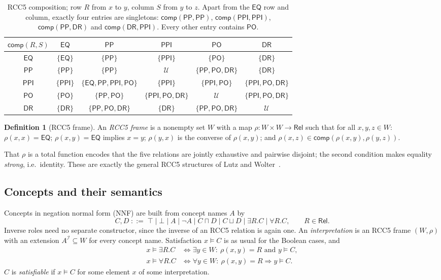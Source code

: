 \documentclass[11pt]{article}
\newcommand{\DR}{\mathsf{DR}}
\newcommand{\PO}{\mathsf{PO}}
\newcommand{\PP}{\mathsf{PP}}
\newcommand{\PPI}{\mathsf{PPI}}
\newcommand{\EQ}{\mathsf{EQ}}
\newcommand{\Rel}{\mathsf{Rel}}
\newcommand{\comp}{\mathsf{comp}}
\theoremstyle{plain}
\theoremstyle{definition}
\newtheorem{definition}[theorem]{Definition}
\begin{document}
\begin{table}[t]
\centering
\footnotesize
\setlength{\tabcolsep}{4pt}
\renewcommand{\arraystretch}{1.2}
\begin{tabular}{@{}c|ccccc@{}}
$\comp(R,S)$ & $\EQ$ & $\PP$ & $\PPI$ & $\PO$ & $\DR$\\
\midrule
$\EQ$ & $\{\EQ\}$ & $\{\PP\}$ & $\{\PPI\}$ & $\{\PO\}$ & $\{\DR\}$\\
$\PP$ & $\{\PP\}$ & $\{\PP\}$ & $\mathcal U$ & $\{\PP,\PO,\DR\}$ & $\{\DR\}$\\
$\PPI$ & $\{\PPI\}$ & $\{\EQ,\PP,\PPI,\PO\}$ & $\{\PPI\}$ & $\{\PPI,\PO\}$ & $\{\PPI,\PO,\DR\}$\\
$\PO$ & $\{\PO\}$ & $\{\PP,\PO\}$ & $\{\PPI,\PO,\DR\}$ & $\mathcal U$ & $\{\PPI,\PO,\DR\}$\\
$\DR$ & $\{\DR\}$ & $\{\PP,\PO,\DR\}$ & $\{\DR\}$ & $\{\PP,\PO,\DR\}$ & $\mathcal U$\\
\end{tabular}
\caption{RCC5 composition; row $R$ from $x$ to $y$, column $S$ from $y$ to $z$.
Apart from the $\EQ$ row and column, exactly four entries are singletons:
$\comp(\PP,\PP)$, $\comp(\PPI,\PPI)$, $\comp(\PP,\DR)$ and $\comp(\DR,\PPI)$. Every
other entry contains $\PO$.}
\label{tab:comp}
\end{table}

\begin{definition}[RCC5 frame]
An \emph{RCC5 frame} is a nonempty set $W$ with a map $\rho:W\times W\to\Rel$
such that for all $x,y,z\in W$: $\rho(x,x)=\EQ$; $\rho(x,y)=\EQ$ implies $x=y$;
$\rho(y,x)$ is the converse of $\rho(x,y)$; and $\rho(x,z)\in
\comp(\rho(x,y),\rho(y,z))$.
\end{definition}

That $\rho$ is a total function encodes that the five relations are jointly
exhaustive and pairwise disjoint; the second condition makes equality
\emph{strong}, i.e.\ identity. These are exactly the general RCC5 structures of
Lutz and Wolter~\cite[\S8]{LutzWolter2006}.

\subsection{Concepts and their semantics}

Concepts in negation normal form (NNF) are built from concept names $A$ by
\[
  C,D \;::=\; \top \mid \bot \mid A \mid \neg A \mid C\sqcap D \mid C\sqcup D
  \mid \exists R.C \mid \forall R.C, \qquad R\in\Rel .
\]
Inverse roles need no separate constructor, since the inverse of an RCC5
relation is again one. An \emph{interpretation} is an RCC5 frame $(W,\rho)$
with an extension $A^{\mathcal I}\subseteq W$ for every concept name.
Satisfaction $x\models C$ is as usual for the Boolean cases, and
\begin{align*}
  x\models\exists R.C &\iff \exists y\in W:\ \rho(x,y)=R \text{ and } y\models C,\\
  x\models\forall R.C &\iff \forall y\in W:\ \rho(x,y)=R \Rightarrow y\models C.
\end{align*}
$C$ is \emph{satisfiable} if $x\models C$ for some element $x$ of some
interpretation.
\end{document}

